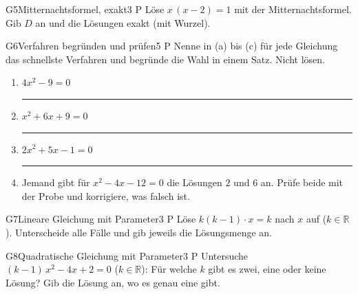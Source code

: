 \documentclass[11pt]{article}
\begin{document}
\begin{lpaufgabe}{G5}{Mitternachtsformel, exakt}{3 P}
Löse $x\,(x - 2) = 1$ mit der Mitternachtsformel. Gib $D$ an und die Lösungen exakt (mit Wurzel).
\end{lpaufgabe}

\begin{lpaufgabe}{G6}{Verfahren begründen und prüfen}{5 P}
Nenne in (a) bis (c) für jede Gleichung das schnellste Verfahren und begründe die Wahl in einem Satz. Nicht lösen.
\begin{enumerate}[label=(\alph*),leftmargin=*,itemsep=1pt]
\item $4x^2 - 9 = 0$\par\vspace{1.4\baselineskip}\noindent\rule{\linewidth}{0.3pt}
\item $x^2 + 6x + 9 = 0$\par\vspace{1.4\baselineskip}\noindent\rule{\linewidth}{0.3pt}
\item $2x^2 + 5x - 1 = 0$\par\vspace{1.4\baselineskip}\noindent\rule{\linewidth}{0.3pt}
\item Jemand gibt für $x^2 - 4x - 12 = 0$ die Lösungen $2$ und $6$ an. Prüfe beide mit der Probe und korrigiere, was falsch ist.
\end{enumerate}
\end{lpaufgabe}


\begin{lpaufgabe}{G7}{Lineare Gleichung mit Parameter}{3 P}
Löse $k(k - 1) \cdot x = k$ nach $x$ auf ($k \in \mathbb{R}$). Unterscheide alle Fälle und gib jeweils die Lösungsmenge an.
\end{lpaufgabe}

\begin{lpaufgabe}{G8}{Quadratische Gleichung mit Parameter}{3 P}
Untersuche $(k - 1)\,x^2 - 4x + 2 = 0$ ($k \in \mathbb{R}$): Für welche $k$ gibt es zwei, eine oder keine Lösung? Gib die Lösung an, wo es genau eine gibt.
\end{lpaufgabe}
\end{document}
